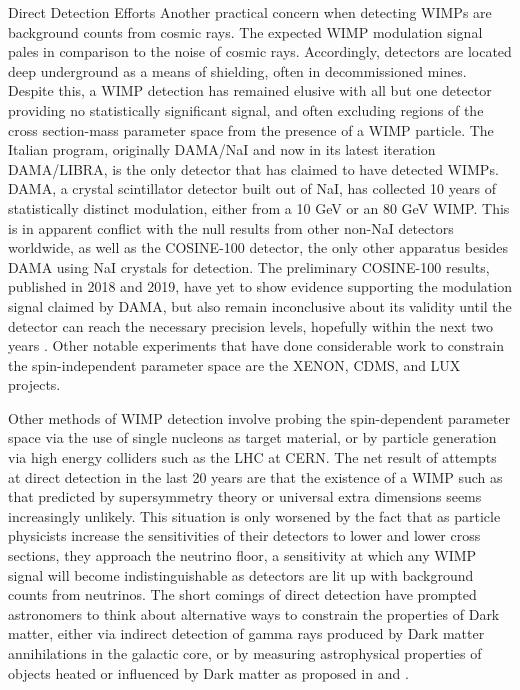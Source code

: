 \documentclass[a4paper,11pt]{article}
\begin{document}
\begin{section}{Direct Detection Efforts}
    Another practical concern when detecting WIMPs are background counts from cosmic rays.
    The expected WIMP modulation signal pales in comparison to the noise of cosmic rays.
    Accordingly, detectors are located deep underground as a means of shielding, often in decommissioned mines.
    Despite this, a WIMP detection has remained elusive with all but one detector providing no statistically significant signal, and often excluding regions of the cross section-mass parameter space from the presence of a WIMP particle.
    The Italian program, originally  DAMA/NaI and now in its latest iteration DAMA/LIBRA, is the only detector that has claimed to have detected WIMPs.
    DAMA, a crystal scintillator detector built out of NaI, has collected 10 years of statistically distinct modulation, either from a 10 GeV or an 80 GeV WIMP.
    This is in apparent conflict with the null results from other non-NaI detectors worldwide, as well as the COSINE-100 detector, the only other apparatus besides DAMA using NaI crystals for detection.
    The preliminary COSINE-100 results, published in 2018 and 2019, have yet to show evidence supporting the modulation signal claimed by DAMA, but also remain inconclusive about its validity until the detector can reach the necessary precision levels, hopefully within the next two years \cite{Cosine:2018} \cite{Cosine:2019}.
    Other notable experiments that have done considerable work to constrain the spin-independent parameter space are the XENON, CDMS, and LUX projects.

    Other methods of WIMP detection involve probing the spin-dependent parameter space via the use of single nucleons as target material, or by particle generation via high energy colliders such as the LHC at CERN.
    The net result of attempts at direct detection in the last 20 years are that the existence of a WIMP such as that predicted by supersymmetry theory or universal extra dimensions seems increasingly unlikely.
    This situation is only worsened by the fact that as particle physicists increase the sensitivities of their detectors to lower and lower cross sections, they approach the neutrino floor, a sensitivity at which any WIMP signal will become indistinguishable as detectors are lit up with background counts from neutrinos.
    The short comings of direct detection have prompted astronomers to think about alternative ways to constrain the properties of Dark matter, either via indirect detection of gamma rays produced by Dark matter annihilations in the galactic core, or by measuring astrophysical properties of objects heated or influenced by Dark matter as proposed in \cite{Ilie:2020popiii} and \cite{Ilie:2020floor}.
\end{section}
\end{document}
